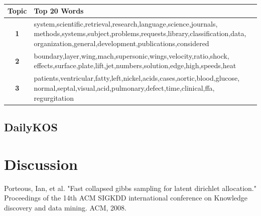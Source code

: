 \documentclass[twoside,12pt]{article}
\begin{document}
\begin{table}[!]
\begin{center}
\begin{tabular}{| c | p{12cm} |}
\hline
\textbf{Topic}& \textbf{Top 20 Words}  \\ \hline
\textbf{1}&system,scientific,retrieval,research,language,science,journals, methods,systems,subject,problems,requests,library,classification,data, organization,general,development,publications,considered\\ \hline
\textbf{2}&boundary,layer,wing,mach,supersonic,wings,velocity,ratio,shock, effects,surface,plate,lift,jet,numbers,solution,edge,high,speeds,heat\\
 \hline
\textbf{3}&patients,ventricular,fatty,left,nickel,acids,cases,aortic,blood,glucose, normal,septal,visual,acid,pulmonary,defect,time,clinical,ffa, regurgitation\\
 \hline
 
\end{tabular}
\caption{}
\label{table:2}
\end{center}
\end{table}


\subsection{DailyKOS}

\section{Discussion}


\begin{thebibliography}{9}
Porteous, Ian, et al. "Fast collapsed gibbs sampling for latent dirichlet allocation." Proceedings of the 14th ACM SIGKDD international conference on Knowledge discovery and data mining. ACM, 2008.

\end{thebibliography}
\end{document}
